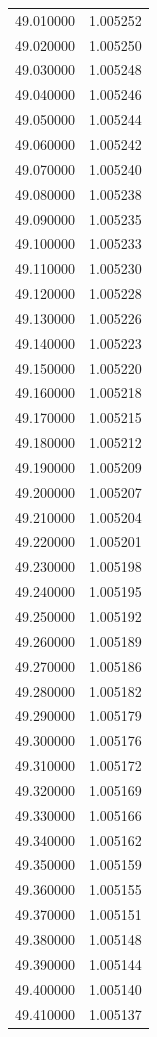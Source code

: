 \begin{tabular}{rr}
49.010000 & 1.005252 \\
49.020000 & 1.005250 \\
49.030000 & 1.005248 \\
49.040000 & 1.005246 \\
49.050000 & 1.005244 \\
49.060000 & 1.005242 \\
49.070000 & 1.005240 \\
49.080000 & 1.005238 \\
49.090000 & 1.005235 \\
49.100000 & 1.005233 \\
49.110000 & 1.005230 \\
49.120000 & 1.005228 \\
49.130000 & 1.005226 \\
49.140000 & 1.005223 \\
49.150000 & 1.005220 \\
49.160000 & 1.005218 \\
49.170000 & 1.005215 \\
49.180000 & 1.005212 \\
49.190000 & 1.005209 \\
49.200000 & 1.005207 \\
49.210000 & 1.005204 \\
49.220000 & 1.005201 \\
49.230000 & 1.005198 \\
49.240000 & 1.005195 \\
49.250000 & 1.005192 \\
49.260000 & 1.005189 \\
49.270000 & 1.005186 \\
49.280000 & 1.005182 \\
49.290000 & 1.005179 \\
49.300000 & 1.005176 \\
49.310000 & 1.005172 \\
49.320000 & 1.005169 \\
49.330000 & 1.005166 \\
49.340000 & 1.005162 \\
49.350000 & 1.005159 \\
49.360000 & 1.005155 \\
49.370000 & 1.005151 \\
49.380000 & 1.005148 \\
49.390000 & 1.005144 \\
49.400000 & 1.005140 \\
49.410000 & 1.005137 \\

\end{tabular}

